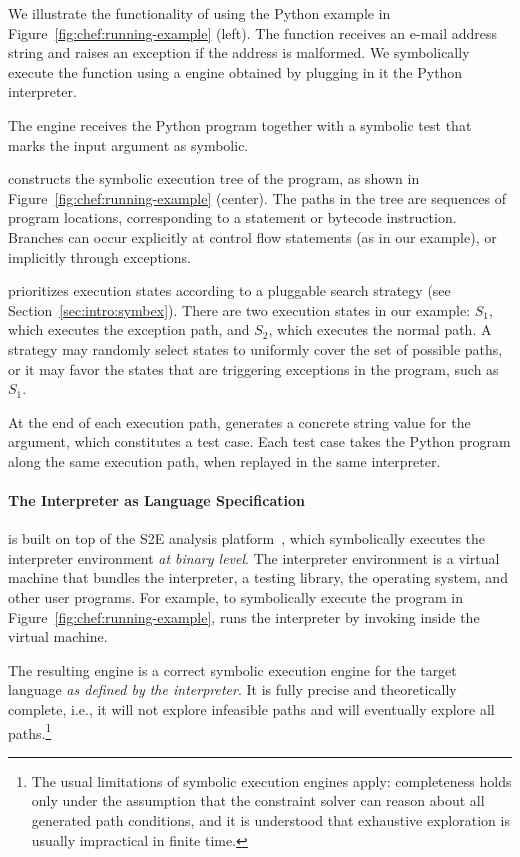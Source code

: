 We illustrate the functionality of \chef using the Python example in Figure~\ref{fig:chef:running-example} (left).
%
The function  receives an e-mail address string and raises an exception if the address is malformed.
%
We symbolically execute the function using a \chef engine obtained by plugging in it the Python interpreter.

The \chef engine receives the Python program together with a symbolic test that marks the  input argument as symbolic.

\chef constructs the symbolic execution tree of the program, as shown in Figure~\ref{fig:chef:running-example} (center).
%
The paths in the tree are sequences of program locations, corresponding to a statement or bytecode instruction.  Branches can occur explicitly at control flow statements (as in our example), or implicitly through exceptions.

\chef prioritizes execution states according to a pluggable search strategy (see Section~\ref{sec:intro:symbex}).
%
There are two execution states in our example: $S_1$, which executes the exception path, and $S_2$, which executes the normal path.
%
A strategy may randomly select states to uniformly cover the set of possible paths, or it may favor the states that are triggering exceptions in the program, such as $S_1$.

At the end of each execution path, \chef generates a concrete string value for the  argument, which constitutes a test case.
%
Each test case takes the Python program along the same execution path, when replayed in the same interpreter.


\paragraph{The Interpreter as Language Specification}

\chef is built on top of the S2E analysis platform~\cite{s2eSystem}, which symbolically executes the interpreter environment \emph{at binary level}.
%
The interpreter environment is a virtual machine that bundles the interpreter, a testing library, the operating system, and other user programs.
%
For example, to symbolically execute the program in Figure~\ref{fig:chef:running-example},  \chef runs the interpreter by invoking  inside the virtual machine.

The resulting engine is a correct symbolic execution engine for the target language \emph{as defined by the interpreter}.
%
It is fully precise and theoretically complete, i.e., it will not explore infeasible paths and will eventually explore all paths.\footnote{The usual limitations of symbolic execution engines apply: completeness holds only under the assumption that the constraint solver can reason about all generated path conditions, and it is understood that exhaustive exploration is usually impractical in finite time.}

